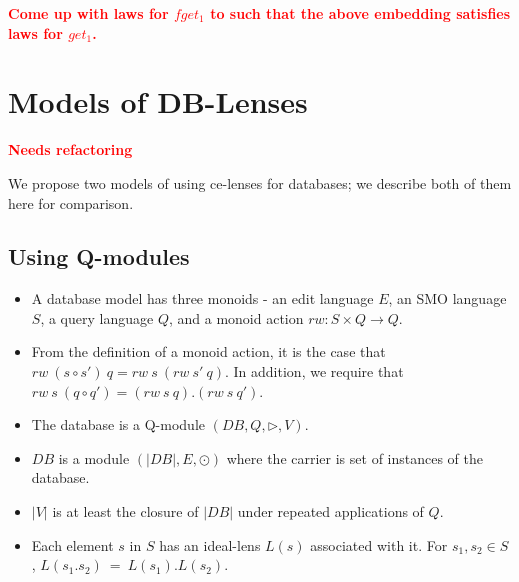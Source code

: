 \documentclass[a4paper,10pt]{article}
\newcommand{\finish}[1]{#1}
\newcommand{\comment}[1]{\finish{\textbf{\textcolor{red}{#1}}}}
\begin{document}
\comment{Come up with laws for $fget_1$ to such that the above
  embedding satisfies laws for $get_1$.}

\section{Models of DB-Lenses}
\comment{Needs refactoring}

  We propose two models of using ce-lenses for databases; we describe both of them here for comparison.
  
\subsection{Using Q-modules}
\begin{itemize}
\item A database model has three monoids - an edit language $E$, an SMO language $S$, a query language $Q$, and a monoid action $rw : S \times Q \to Q$.
 
\item From the definition of a monoid action, it is the case that $rw~(s \circ s')~q = rw~s~(rw~s'~q)$. In addition, we require that $rw~s~(q \circ q') = (rw~s~q). (rw~s~q')$.
\item The database is a Q-module $(DB,Q,\rhd,V)$.
\item $DB$ is a module $(|DB|,E,\odot)$ where the carrier is set of instances of the database.
\item $|V|$ is at least the closure of $|DB|$ under repeated applications of $Q$.
\item Each element $s$ in $S$ has an ideal-lens $L(s)$ associated with it. For $s_1,s_2 \in S$, $L(s_1 . s_2) ~=~ L(s_1) . L(s_2)$.
\end{itemize}
\end{document}
